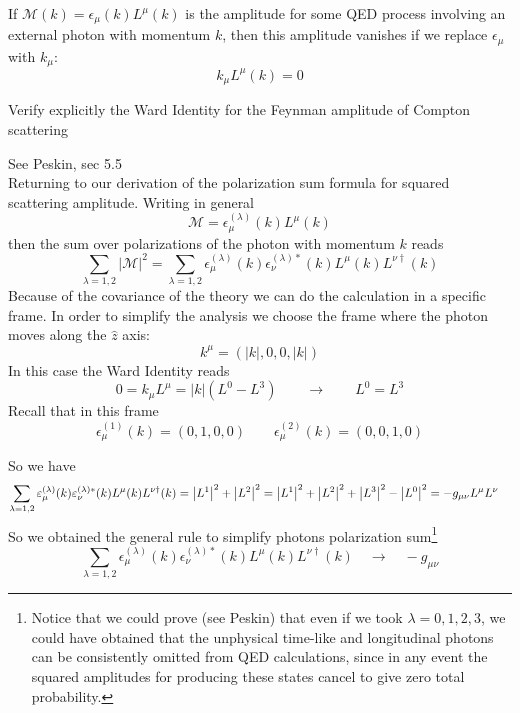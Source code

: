 \documentclass[TheoreticalPhy_ModB.tex]{subfiles}
\begin{document}

\begin{quoting}
If $\mathcal M(k)=\epsilon_\mu(k)L^\mu(k)$ is the amplitude for some QED process involving an external photon with momentum $k$, then this amplitude vanishes if we replace $\epsilon_\mu$ with $k_\mu$:
\[k_\mu L^\mu(k)=0\]
\end{quoting}

\begin{example}
Verify explicitly the Ward Identity for the Feynman amplitude of Compton scattering
\end{example}

\textsf{See Peskin, sec 5.5}\\
Returning to our derivation of the polarization sum formula for squared scattering amplitude. Writing in general
\[\mathcal M=\epsilon_\mu^{(\lambda)}(k)L^\mu(k)\]
then the sum over polarizations of the photon with momentum $k$ reads
\[\sum_{\lambda=1,2}|\mathcal M|^2=\sum_{\lambda=1,2}\epsilon_\mu^{(\lambda)}(k)\epsilon_\nu^{(\lambda)*}(k)L^\mu(k)L^{\nu\dagger}(k)\]
Because of the covariance of the theory we can do the calculation in a specific frame. In order to simplify the analysis we choose the frame where the photon moves along the $\hat z$ axis:
\[k^\mu=(|k|,0,0,|k|)\]
In this case the Ward Identity reads
\[0=k_\mu L^\mu=|k|\left(L^0-L^3\right)\qquad\longrightarrow\qquad L^0=L^3\]
Recall that in this frame
\[\epsilon_\mu^{(1)}(k)=(0,1,0,0)\qquad\epsilon_\mu^{(2)}(k)=(0,0,1,0)\]

So we have
\begin{align*}\sum_{\lambda=1,2}\varepsilon_\mu^{(\lambda)}(k)\varepsilon_\nu^{(\lambda)*}(k)L^\mu(k)L^{\nu\dagger}(k)&=\left\lvert L^1 \right\rvert^2+\left\lvert L^2 \right\rvert^2=\left\lvert L^1 \right\rvert^2+\left\lvert L^2 \right\rvert^2+\left\lvert L^3 \right\rvert^2-\left\lvert L^0 \right\rvert^2=-g_{\mu\nu}L^\mu L^\nu
\end{align*}
So we obtained the general rule to simplify photons polarization sum\footnote{Notice that we could prove (see Peskin) that even if we took $\lambda=0,1,2,3$, we could have obtained that the unphysical time-like and longitudinal photons can be consistently omitted from QED calculations, since in any event the squared amplitudes for producing these states cancel to give zero total probability. }
\[\sum_{\lambda=1,2}\epsilon_\mu^{(\lambda)}(k)\epsilon_\nu^{(\lambda)*}(k)L^\mu(k)L^{\nu\dagger}(k)\quad\longrightarrow\quad-g_{\mu\nu}\]
\end{document}
